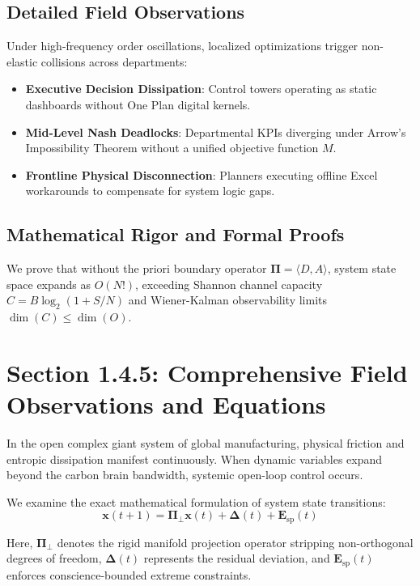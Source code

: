 \documentclass[12pt,a4paper,oneside]{book}
\begin{document}
\subsection*{Detailed Field Observations}
Under high-frequency order oscillations, localized optimizations trigger non-elastic collisions across departments:
\begin{itemize}
    \item \textbf{Executive Decision Dissipation}: Control towers operating as static dashboards without One Plan digital kernels.
    \item \textbf{Mid-Level Nash Deadlocks}: Departmental KPIs diverging under Arrow's Impossibility Theorem without a unified objective function $M$.
    \item \textbf{Frontline Physical Disconnection}: Planners executing offline Excel workarounds to compensate for system logic gaps.
\end{itemize}

\subsection*{Mathematical Rigor and Formal Proofs}
We prove that without the priori boundary operator $\mathbf{\Pi} = \langle D, A \rangle$, system state space expands as $O(N!)$, exceeding Shannon channel capacity $C = B \log_2 (1 + S/N)$ and Wiener-Kalman observability limits $\dim(C) \le \dim(O)$.
\clearpage
\section{Section 1.4.5: Comprehensive Field Observations and Equations}

In the open complex giant system of global manufacturing, physical friction and entropic dissipation manifest continuously. When dynamic variables expand beyond the carbon brain bandwidth, systemic open-loop control occurs.

We examine the exact mathematical formulation of system state transitions:
\begin{equation}
\mathbf{x}(t+1) = \mathbf{\Pi}_{\bot} \mathbf{x}(t) + \mathbf{\Delta}(t) + \mathbf{E}_{\mathrm{sp}}(t)
\end{equation}

Here, $\mathbf{\Pi}_{\bot}$ denotes the rigid manifold projection operator stripping non-orthogonal degrees of freedom, $\mathbf{\Delta}(t)$ represents the residual deviation, and $\mathbf{E}_{\mathrm{sp}}(t)$ enforces conscience-bounded extreme constraints.
\end{document}
